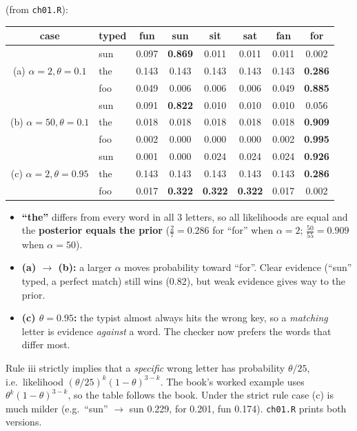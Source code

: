 \documentclass[11pt]{article}
\begin{document}
 (from \texttt{ch01.R}):
\begin{center}
\small
\begin{tabular}{cl|cccccc}\toprule
case & typed & fun & sun & sit & sat & fan & for\\\midrule
\multirow{3}{*}{(a) $\alpha=2,\theta=0.1$}
 & sun & 0.097 & \textbf{0.869} & 0.011 & 0.011 & 0.011 & 0.002\\
 & the & 0.143 & 0.143 & 0.143 & 0.143 & 0.143 & \textbf{0.286}\\
 & foo & 0.049 & 0.006 & 0.006 & 0.006 & 0.049 & \textbf{0.885}\\\midrule
\multirow{3}{*}{(b) $\alpha=50,\theta=0.1$}
 & sun & 0.091 & \textbf{0.822} & 0.010 & 0.010 & 0.010 & 0.056\\
 & the & 0.018 & 0.018 & 0.018 & 0.018 & 0.018 & \textbf{0.909}\\
 & foo & 0.002 & 0.000 & 0.000 & 0.000 & 0.002 & \textbf{0.995}\\\midrule
\multirow{3}{*}{(c) $\alpha=2,\theta=0.95$}
 & sun & 0.001 & 0.000 & 0.024 & 0.024 & 0.024 & \textbf{0.926}\\
 & the & 0.143 & 0.143 & 0.143 & 0.143 & 0.143 & \textbf{0.286}\\
 & foo & 0.017 & \textbf{0.322} & \textbf{0.322} & \textbf{0.322} & 0.017 & 0.002\\\bottomrule
\end{tabular}
\end{center}

\begin{itemize}
\item \textbf{``the''} differs from every word in all 3 letters, so all likelihoods are equal and the \textbf{posterior equals the prior} ($\frac27=0.286$ for ``for'' when $\alpha=2$; $\frac{50}{55}=0.909$ when $\alpha=50$).
\item \textbf{(a) $\to$ (b):} a larger $\alpha$ moves probability toward ``for''. Clear evidence (``sun'' typed, a perfect match) still wins (0.82), but weak evidence gives way to the prior.
\item \textbf{(c) $\theta=0.95$:} the typist almost always hits the wrong key, so a \emph{matching} letter is evidence \emph{against} a word. The checker now prefers the words that differ most.
\end{itemize}

\begin{note}
Rule iii strictly implies that a \emph{specific} wrong letter has probability $\theta/25$, i.e.\ likelihood $(\theta/25)^k(1-\theta)^{3-k}$. The book's worked example uses $\theta^k(1-\theta)^{3-k}$, so the table follows the book. Under the strict rule case (c) is much milder (e.g.\ ``sun'' $\to$ sun 0.229, for 0.201, fun 0.174). \texttt{ch01.R} prints both versions.
\end{note}
\end{document}

